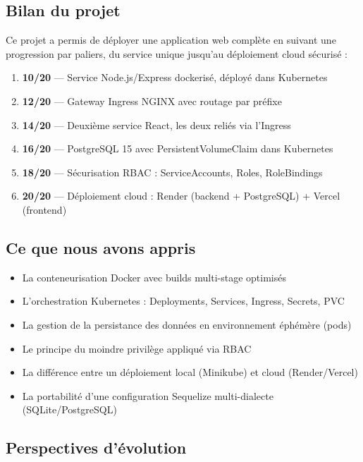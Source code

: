 \documentclass[12pt,a4paper]{article}
\begin{document}
\subsection{Bilan du projet}

Ce projet a permis de déployer une application web complète en suivant une progression
par paliers, du service unique jusqu'au déploiement cloud sécurisé :

\begin{enumerate}
  \item \textbf{10/20} — Service Node.js/Express dockerisé, déployé dans Kubernetes
  \item \textbf{12/20} — Gateway Ingress NGINX avec routage par préfixe
  \item \textbf{14/20} — Deuxième service React, les deux reliés via l'Ingress
  \item \textbf{16/20} — PostgreSQL 15 avec PersistentVolumeClaim dans Kubernetes
  \item \textbf{18/20} — Sécurisation RBAC : ServiceAccounts, Roles, RoleBindings
  \item \textbf{20/20} — Déploiement cloud : Render (backend + PostgreSQL) + Vercel (frontend)
\end{enumerate}

\subsection{Ce que nous avons appris}

\begin{itemize}
  \item La conteneurisation Docker avec builds multi-stage optimisés
  \item L'orchestration Kubernetes : Deployments, Services, Ingress, Secrets, PVC
  \item La gestion de la persistance des données en environnement éphémère (pods)
  \item Le principe du moindre privilège appliqué via RBAC
  \item La différence entre un déploiement local (Minikube) et cloud (Render/Vercel)
  \item La portabilité d'une configuration Sequelize multi-dialecte (SQLite/PostgreSQL)
\end{itemize}

\subsection{Perspectives d'évolution}
\end{document}
